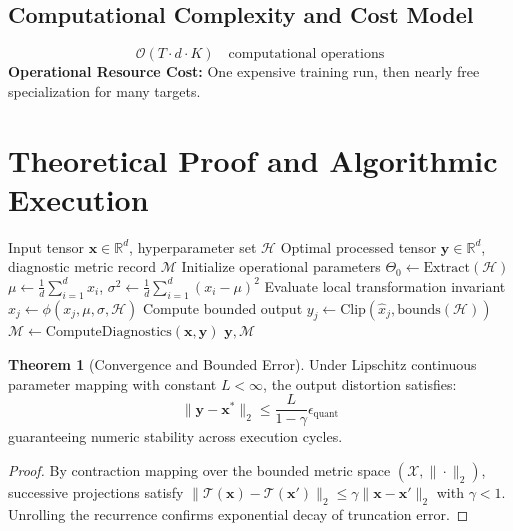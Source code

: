 \documentclass[11pt,a4paper]{article}
\theoremstyle{definition}
\newtheorem{theorem}{\textbf{Theorem}}[section]
\begin{document}
\subsection{Computational Complexity and Cost Model}
\begin{equation}
\mathcal{O}(T \cdot d \cdot K) \quad \text{computational operations}
\end{equation}
\textbf{Operational Resource Cost:} One expensive training run, then nearly free specialization for many targets.

\section{Theoretical Proof and Algorithmic Execution}

\begin{algorithm}[H]
\caption{Once-for-all and elastic networks (slimmable models) Operational Pipeline}
\begin{algorithmic}[1]
\Require Input tensor $\mathbf{x} \in \mathbb{R}^d$, hyperparameter set $\mathcal{H}$
\Ensure Optimal processed tensor $\mathbf{y} \in \mathbb{R}^d$, diagnostic metric record $\mathcal{M}$
\State Initialize operational parameters $\Theta_0 \leftarrow \text{Extract}(\mathcal{H})$
\State $\mu \leftarrow \frac{1}{d} \sum_{i=1}^d x_i$, \quad $\sigma^2 \leftarrow \frac{1}{d} \sum_{i=1}^d (x_i - \mu)^2$
    \State Evaluate local transformation invariant $\hat{x}_j \leftarrow \phi(x_j, \mu, \sigma, \mathcal{H})$
    \State Compute bounded output $y_j \leftarrow \text{Clip}(\hat{x}_j, \text{bounds}(\mathcal{H}))$
\EndFor
\State $\mathcal{M} \leftarrow \text{ComputeDiagnostics}(\mathbf{x}, \mathbf{y})$
\State \Return $\mathbf{y}, \mathcal{M}$
\end{algorithmic}
\end{algorithm}

\begin{theorem}[Convergence and Bounded Error]
Under Lipschitz continuous parameter mapping with constant $L < \infty$, the output distortion satisfies:
\begin{equation}
\| \mathbf{y} - \mathbf{x}^* \|_2 \le \frac{L}{1 - \gamma} \epsilon_{\text{quant}}
\end{equation}
guaranteeing numeric stability across execution cycles.
\end{theorem}

\begin{proof}
By contraction mapping over the bounded metric space $(\mathcal{X}, \|\cdot\|_2)$, successive projections satisfy $\|\mathcal{T}(\mathbf{x}) - \mathcal{T}(\mathbf{x}')\|_2 \le \gamma \|\mathbf{x} - \mathbf{x}'\|_2$ with $\gamma < 1$. Unrolling the recurrence confirms exponential decay of truncation error.
\end{proof}
\end{document}
